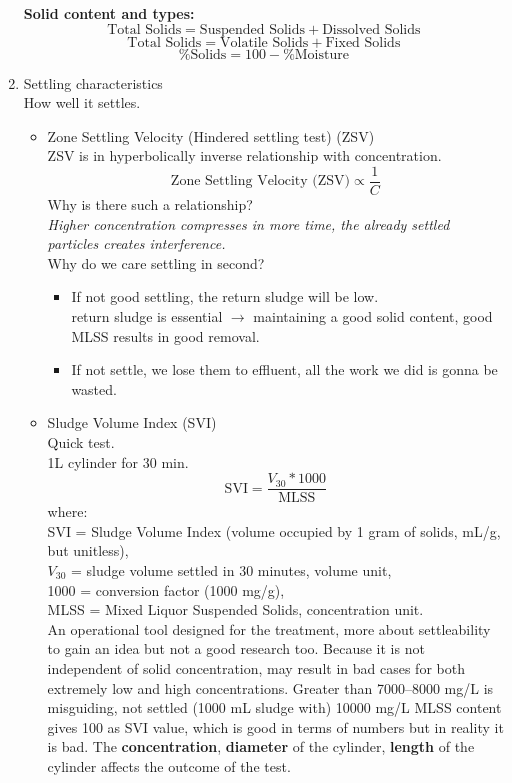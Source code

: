 \documentclass{article}
\numberwithin{equation}{section}
\begin{document}
\begin{enumerate}
    \textbf{Solid content and types:}
    \[
    \text{Total Solids} = \text{Suspended Solids} + \text{Dissolved Solids}
    \]
    \[
    \text{Total Solids} = \text{Volatile Solids} + \text{Fixed Solids}
    \]
    \[
    \text{\% Solids} = 100 - \text{\% Moisture}
    \]
    \item Settling characteristics\\
    How well it settles.
    \begin{itemize}
        \item Zone Settling Velocity (Hindered settling test) (ZSV)\\
        ZSV is in hyperbolically inverse relationship with concentration.
        \[
        \text{Zone Settling Velocity (ZSV)} \propto \frac{1}{C}
        \]
        Why is there such a relationship?\\
        \emph{Higher concentration compresses in more time, the already settled particles creates interference.}\\
        Why do we care settling in second?
        \begin{itemize}
            \item If not good settling, the return sludge will be low.\\
            return sludge is essential $\rightarrow$ maintaining a good solid content, good MLSS results in good removal.
            \item If not settle, we lose them to effluent, all the work we did is gonna be wasted.
        \end{itemize}
        \item Sludge Volume Index (SVI)\\
        Quick test.\\
        1L cylinder for 30 min.
        \[
        \text{SVI} = \frac{V_{30}*1000}{\text{MLSS}}
        \]
        where:\\
        SVI = Sludge Volume Index (volume occupied by 1 gram of solids, mL/g, but unitless),\\
        $V_{30}$ = sludge volume settled in 30 minutes, volume unit,\\
        1000 = conversion factor (1000 mg/g),\\
        MLSS = Mixed Liquor Suspended Solids, concentration unit.\\
        An operational tool designed for the  treatment, more about settleability to gain an idea but not a good research too. Because it is not independent of solid concentration, may result in bad cases for both extremely low and high concentrations. Greater than 7000--8000 mg/L is misguiding, not settled (1000 mL sludge with) 10000 mg/L MLSS content gives 100 as SVI value, which is good in terms of numbers but in reality it is bad. The \textbf{concentration}, \textbf{diameter} of the cylinder, \textbf{length} of the cylinder affects the outcome of the test.

\end{itemize}
\end{enumerate}
\end{document}
